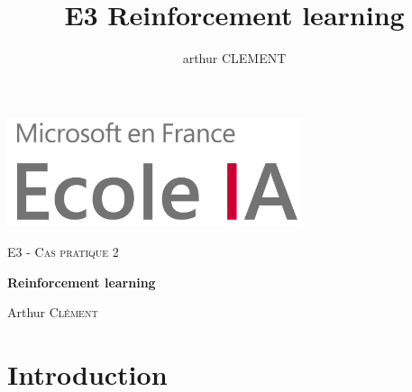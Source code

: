 \documentclass[a4paper,12pt]{article}
\title{E3 Reinforcement learning}
\author{arthur CLEMENT}
\begin{document}
\begin{titlepage}
    \thispagestyle{fancy}
	\centering
	\includegraphics[width=0.65\textwidth]{Ecole_IA_logo_cropped.png}\par
	\vspace{1cm}



    \vspace{3cm}
    {\scshape\Large E3 - Cas pratique 2}\par
    \vspace{1cm}
    {\huge\bf Reinforcement learning}\par
    \vfill
    Arthur {\scshape Clément}

\end{titlepage}

\sffamily

\newpage
{}
\renewcommand*\contentsname{Sommaire}
\tableofcontents

\section{Introduction}
\end{document}
